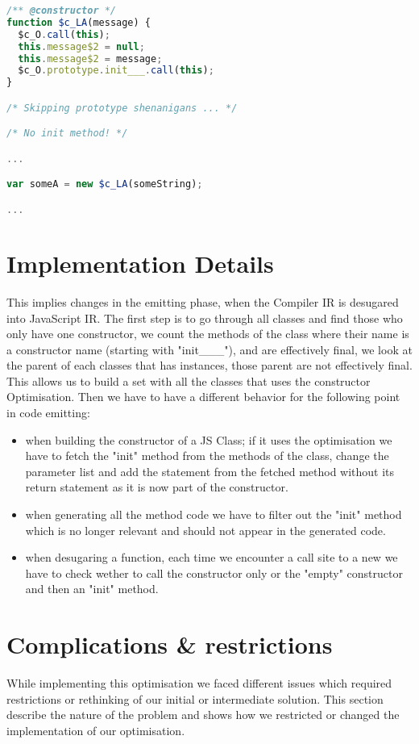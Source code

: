 \begin{lstlisting}[language=javascript,caption=Generated JavaScript with constructor optimisation.]
/** @constructor */
function $c_LA(message) {
  $c_O.call(this);
  this.message$2 = null;
  this.message$2 = message;
  $c_O.prototype.init___.call(this);
}

/* Skipping prototype shenanigans ... */

/* No init method! */

...

var someA = new $c_LA(someString);

...

\end{lstlisting}

\section{Implementation Details}
This implies changes in the emitting phase, when the Compiler IR is desugared into JavaScript IR. The first step is to go through all classes and find those who only have one constructor, we count the methods of the class where their name is a constructor name (starting with "init\_\_\_"), and are effectively final, we look at the parent of each classes that has instances, those parent are not effectively final. This allows us to build a set with all the classes that uses the constructor Optimisation. Then we have to have a different behavior for the following point in code emitting:
\begin{itemize}
    \item when building the constructor of a JS Class; if it uses the optimisation we have to fetch the "init" method from the methods of the class, change the parameter list and add the statement from the fetched method without its return statement as it is now part of the constructor.
    \item when generating all the method code we have to filter out the "init" method which is no longer relevant and should not appear in the generated code.
    \item when desugaring a function, each time we encounter a call site to a new we have to check wether to call the constructor only or the "empty" constructor and then an "init" method.
\end{itemize}

\section{Complications \& restrictions}
While implementing this optimisation we faced different issues which required restrictions or rethinking of our initial or intermediate solution. This section describe the nature of the problem and shows how we restricted or changed the implementation of our optimisation.
